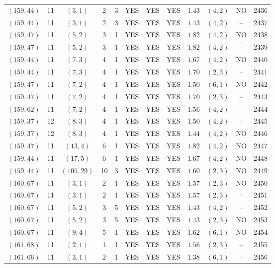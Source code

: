 \begin{longtable}{|c|c|c|c|c|c|c|c|c|c|c|c|}
$(159,44)$ & 11 & $(3,1)$ & 2 & 3 & YES & YES & YES & $1.43$ & $(4,2)$ & NO & 2436\\
$(159,44)$ & 11 & $(3,1)$ & 2 & 3 & YES & YES & YES & $1.43$ & $(4,2)$ & -- & 2437\\
$(159,47)$ & 11 & $(5,2)$ & 3 & 1 & YES & YES & YES & $1.82$ & $(4,2)$ & NO & 2438\\
$(159,47)$ & 11 & $(5,2)$ & 3 & 1 & YES & YES & YES & $1.82$ & $(4,2)$ & -- & 2439\\
$(159,44)$ & 11 & $(7,3)$ & 4 & 1 & YES & YES & YES & $1.67$ & $(4,2)$ & NO & 2440\\
$(159,44)$ & 11 & $(7,3)$ & 4 & 1 & YES & YES & YES & $1.70$ & $(2,3)$ & -- & 2441\\
$(159,47)$ & 11 & $(7,2)$ & 4 & 1 & YES & YES & YES & $1.50$ & $(6,1)$ & NO & 2442\\
$(159,47)$ & 11 & $(7,2)$ & 4 & 1 & YES & YES & YES & $1.70$ & $(2,3)$ & -- & 2443\\
$(159,62)$ & 11 & $(7,2)$ & 4 & 1 & YES & YES & YES & $1.56$ & $(4,2)$ & -- & 2444\\
$(159,37)$ & 12 & $(8,3)$ & 4 & 1 & YES & YES & YES & $1.50$ & $(4,2)$ & -- & 2445\\
$(159,37)$ & 12 & $(8,3)$ & 4 & 1 & YES & YES & YES & $1.44$ & $(4,2)$ & NO & 2446\\
$(159,47)$ & 11 & $(13,4)$ & 6 & 1 & YES & YES & YES & $1.82$ & $(4,2)$ & NO & 2447\\
$(159,44)$ & 11 & $(17,5)$ & 6 & 1 & YES & YES & YES & $1.67$ & $(4,2)$ & NO & 2448\\
$(159,44)$ & 11 & $(105,29)$ & 10 & 3 & YES & YES & YES & $1.60$ & $(2,3)$ & NO & 2449\\
$(160,67)$ & 11 & $(3,1)$ & 2 & 1 & YES & YES & YES & $1.57$ & $(2,3)$ & NO & 2450\\
$(160,67)$ & 11 & $(3,1)$ & 2 & 1 & YES & YES & YES & $1.57$ & $(2,3)$ & -- & 2451\\
$(160,67)$ & 11 & $(5,2)$ & 3 & 5 & YES & YES & YES & $1.43$ & $(4,2)$ & -- & 2452\\
$(160,67)$ & 11 & $(5,2)$ & 3 & 5 & YES & YES & YES & $1.43$ & $(2,3)$ & NO & 2453\\
$(160,67)$ & 11 & $(9,4)$ & 5 & 1 & YES & YES & YES & $1.62$ & $(6,1)$ & NO & 2454\\
$(161,68)$ & 11 & $(2,1)$ & 1 & 1 & YES & YES & YES & $1.56$ & $(2,3)$ & -- & 2455\\
$(161,66)$ & 11 & $(3,1)$ & 2 & 1 & YES & YES & YES & $1.38$ & $(6,1)$ & -- & 2456\\

\end{longtable}
